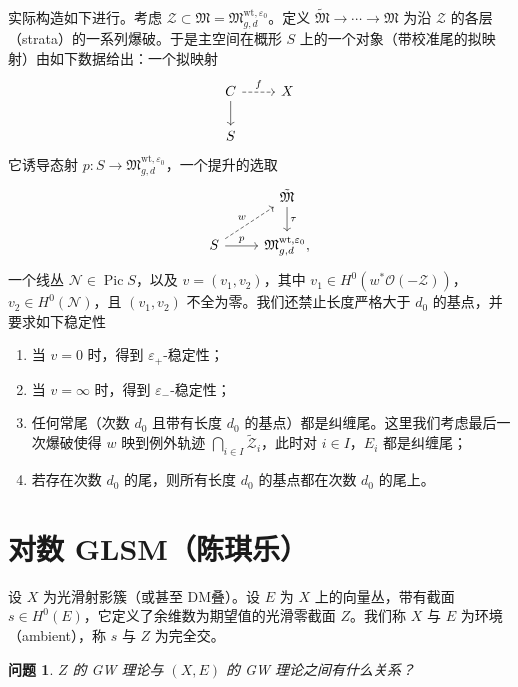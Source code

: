 \documentclass{amsart}
\newtheorem{quest}[thm]{问题}
\theoremstyle{definition}
\theoremstyle{remark}
\theoremstyle{plain}
\theoremstyle{definition}
\theoremstyle{remark}
\newcommand{\ep}{\varepsilon}
\newcommand{\mc}[1]{\mathcal{#1}}
\newcommand{\mf}[1]{\mathfrak{#1}}
\newcommand{\mr}[1]{\mathrm{#1}}
\newcommand{\1}{\mathbf{1}}
\newcommand{\2}{\mathbf{2}}
\newcommand{\3}{\mathbf{3}}
\DeclareMathOperator{\Pic}{Pic}
\begin{document}
实际构造如下进行。考虑 \(\mc{Z} \subset \mf{M} = \mf{M}_{g,d}^{\mr{wt}, \ep_0}\)。定义 \(\tilde{\mf{M}} \to \cdots \to \mf{M}\) 为沿 \(\mc{Z}\) 的各层（strata）的一系列爆破。于是主空间在概形 \(S\) 上的一个对象（带校准尾的拟映射）由如下数据给出：一个拟映射
\begin{equation*}
\begin{tikzcd}
    C \ar{d} \ar[dashrightarrow]{r}{f} & X \\
    S
\end{tikzcd}
\end{equation*}
它诱导态射 \(p \colon S \to \mf{M}_{g,d}^{\mr{wt}, \ep_0}\)，一个提升的选取
\begin{equation*}
\begin{tikzcd}
    & \tilde{\mf{M}} \ar{d}{\tau} \\
    S \ar{r}{p} \ar[dashrightarrow]{ur}{w} & \mf{M}_{g,d}^{\mr{wt}, \ep_0},
\end{tikzcd}
\end{equation*}
一个线丛 \(\mc{N} \in \Pic S\)，以及 \(v = (v_1, v_2)\)，其中 \(v_1 \in H^0(w^* \mc{O}(-\mc{Z}))\)，\(v_2 \in H^0(\mc{N})\)，且 \((v_1, v_2)\) 不全为零。我们还禁止长度严格大于 \(d_0\) 的基点，并要求如下稳定性
\begin{enumerate}
    \item 当 \(v = 0\) 时，得到 \(\ep_+\)-稳定性；
    \item 当 \(v = \infty\) 时，得到 \(\ep_-\)-稳定性；
    \item 任何常尾（次数 \(d_0\) 且带有长度 \(d_0\) 的基点）都是纠缠尾。这里我们考虑最后一次爆破使得 \(w\) 映到例外轨迹 \(\bigcap_{i \in I} \tilde{\mc{Z}}_i\)，此时对 \(i \in I\)，\(E_i\) 都是纠缠尾；
    \item 若存在次数 \(d_0\) 的尾，则所有长度 \(d_0\) 的基点都在次数 \(d_0\) 的尾上。
\end{enumerate}








\section{对数 GLSM（陈琪乐）}%
\label{sec:Log GLSM (Qile Chen)}

设 \(X\) 为光滑射影簇（或甚至 DM叠）。设 \(E\) 为 \(X\) 上的向量丛，带有截面 \(s \in H^0(E)\)，它定义了余维数为期望值的光滑零截面 \(Z\)。我们称 \(X\) 与 \(E\) 为环境（ambient），称 \(s\) 与 \(Z\) 为完全交。

\begin{quest}
    \(Z\) 的 GW 理论与 \((X, E)\) 的 GW 理论之间有什么关系？
\end{quest}
\end{document}
